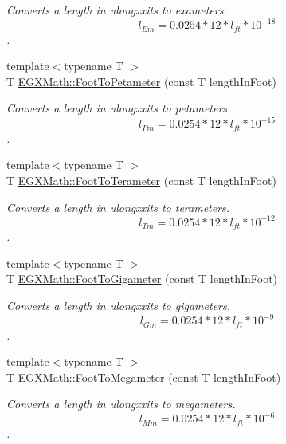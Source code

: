 \begin{DoxyCompactItemize}
\begin{DoxyCompactList}\small\item\em Converts a length in ulongxxits to exameters. \[ l_{Em}=0.0254 * 12 * l_{ft} * 10^{-18} \]. \end{DoxyCompactList}\item 
{\footnotesize template$<$typename T $>$ }\\T \mbox{\hyperlink{group___e_g_x_math-_conversions-_length_conversions-_imperial-_foot-_s_i_ga6f7eedec51b5247e174460561bf4707b}{E\+G\+X\+Math\+::\+Foot\+To\+Petameter}} (const T length\+In\+Foot)
\begin{DoxyCompactList}\small\item\em Converts a length in ulongxxits to petameters. \[ l_{Pm}=0.0254 * 12 * l_{ft} * 10^{-15} \]. \end{DoxyCompactList}\item 
{\footnotesize template$<$typename T $>$ }\\T \mbox{\hyperlink{group___e_g_x_math-_conversions-_length_conversions-_imperial-_foot-_s_i_ga5ef1947187e98d3000e3c1eb836df0af}{E\+G\+X\+Math\+::\+Foot\+To\+Terameter}} (const T length\+In\+Foot)
\begin{DoxyCompactList}\small\item\em Converts a length in ulongxxits to terameters. \[ l_{Tm}=0.0254 * 12 * l_{ft} * 10^{-12} \]. \end{DoxyCompactList}\item 
{\footnotesize template$<$typename T $>$ }\\T \mbox{\hyperlink{group___e_g_x_math-_conversions-_length_conversions-_imperial-_foot-_s_i_ga396dd6b0ee16dd5c9a11688377a85c52}{E\+G\+X\+Math\+::\+Foot\+To\+Gigameter}} (const T length\+In\+Foot)
\begin{DoxyCompactList}\small\item\em Converts a length in ulongxxits to gigameters. \[ l_{Gm}=0.0254 * 12 * l_{ft} * 10^{-9} \]. \end{DoxyCompactList}\item 
{\footnotesize template$<$typename T $>$ }\\T \mbox{\hyperlink{group___e_g_x_math-_conversions-_length_conversions-_imperial-_foot-_s_i_ga6c4a1e4268e872deaa6e8167c69b0038}{E\+G\+X\+Math\+::\+Foot\+To\+Megameter}} (const T length\+In\+Foot)
\begin{DoxyCompactList}\small\item\em Converts a length in ulongxxits to megameters. \[ l_{Mm}=0.0254 * 12 * l_{ft} * 10^{-6} \]. \end{DoxyCompactList}\item 

\end{DoxyCompactItemize}
